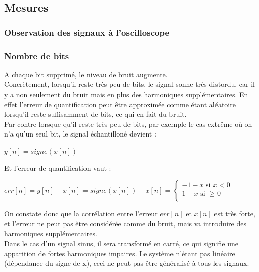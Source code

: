 \documentclass{article}
\begin{document}


\subsection{Mesures}

\subsubsection{Observation des signaux à l'oscilloscope}

\subsubsection{Nombre de bits}
A chaque bit supprimé, le niveau de bruit augmente.\\

Concrètement, lorsqu'il reste très peu de bits, le signal sonne très distordu, car il y a non seulement du bruit mais en plus des harmoniques supplémentaires. En effet l'erreur de quantification peut être approximée comme étant aléatoire lorsqu'il reste suffisamment de bits, ce qui en fait du bruit.\\
Par contre lorsque qu'il reste très peu de bits, par exemple le cas extrême où on n'a qu'un seul bit, le signal échantilloné devient :
\begin{center}$y[n] = signe(x[n])$\end{center}
Et l'erreur de quantification vaut :
\begin{center}$err[n] = y[n] - x[n] = signe(x[n]) - x[n] =
\left\{
  \begin{array}{rcr}
    -1-x \mbox{ si } x<0 \\
    1-x \mbox{ si }\geq 0 \\
  \end{array}
\right.$\end{center}

On constate donc que la corrélation entre l'erreur $err[n]$ et $x[n]$ est très forte, et l'erreur ne peut pas être considérée comme du bruit, mais va introduire des harmoniques supplémentaires.\\
Dans le cas d'un signal sinus, il sera transformé en carré, ce qui signifie une apparition de fortes harmoniques impaires. Le système n'étant pas linéaire (dépendance du signe de x), ceci ne peut pas être généralisé à tous les signaux.\\
\end{document}
